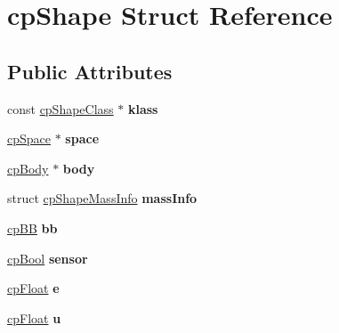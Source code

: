 \hypertarget{structcp_shape}{}\section{cp\+Shape Struct Reference}
\label{structcp_shape}
\subsection*{Public Attributes}
\begin{DoxyCompactItemize}
\item 
\mbox{\label{structcp_shape_a9ad1c384f0f59b5bcb81a25b657f3966}} 
const \mbox{\hyperlink{structcp_shape_class}{cp\+Shape\+Class}} $\ast$ {\bfseries klass}
\item 
\mbox{\label{structcp_shape_a74372a9f1b3ec7668acac8e3b26767b8}} 
\mbox{\hyperlink{structcp_space}{cp\+Space}} $\ast$ {\bfseries space}
\item 
\mbox{\label{structcp_shape_a78d93185612c5dd17ca98574250c3bbf}} 
\mbox{\hyperlink{structcp_body}{cp\+Body}} $\ast$ {\bfseries body}
\item 
\mbox{\label{structcp_shape_a1e0a12332b368de03fbb3ef89f77f317}} 
struct \mbox{\hyperlink{structcp_shape_mass_info}{cp\+Shape\+Mass\+Info}} {\bfseries mass\+Info}
\item 
\mbox{\label{structcp_shape_a116c20032e88c91b24bc4db58fe03281}} 
\mbox{\hyperlink{structcp_b_b}{cp\+BB}} {\bfseries bb}
\item 
\mbox{\label{structcp_shape_a313e68986b75440efbce418429ad11e3}} 
\mbox{\hyperlink{group__basic_types_gabc5e752c48f3449ca26ef413ecbd647e}{cp\+Bool}} {\bfseries sensor}
\item 
\mbox{\label{structcp_shape_aa9c5e01e7c76b34e052a33ecb4df4df4}} 
\mbox{\hyperlink{group__basic_types_gac1ed65573e035bf892505768c852d8d3}{cp\+Float}} {\bfseries e}
\item 
\mbox{\label{structcp_shape_a9fbe92c5b0971f43fe0519241c6a1b0e}} 
\mbox{\hyperlink{group__basic_types_gac1ed65573e035bf892505768c852d8d3}{cp\+Float}} {\bfseries u}

\end{DoxyCompactItemize}
